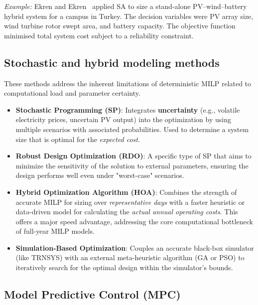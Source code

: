 \documentclass[11pt,a4paper]{report}
\begin{document}
\begin{itemize}
\textit{Example:} Ekren and Ekren~\cite{ekren2010sa} applied SA to size a stand-alone PV--wind--battery hybrid system for a campus in Turkey. The decision variables were PV array size, wind turbine rotor swept area, and battery capacity. The objective function minimised total system cost subject to a reliability constraint. 
\end{itemize}

\subsection{Stochastic and hybrid modeling methods}
These methods address the inherent limitations of deterministic MILP related to computational load and parameter certainty.

\begin{itemize}
    \item \textbf{Stochastic Programming (SP)}: Integrates \textbf{uncertainty} (e.g., volatile electricity prices, uncertain PV output) into the optimization by using multiple scenarios with associated probabilities. Used to determine a system size that is optimal for the \textit{expected cost}.
    \item \textbf{Robust Design Optimization (RDO)}: A specific type of SP that aims to minimize the sensitivity of the solution to external parameters, ensuring the design performs well even under "worst-case" scenarios.
    \item \textbf{Hybrid Optimization Algorithm (HOA)}: Combines the strength of accurate MILP for sizing over \textit{representative days} with a faster heuristic or data-driven model for calculating the \textit{actual annual operating costs}. This offers a major speed advantage, addressing the core computational bottleneck of full-year MILP models.
    \item \textbf{Simulation-Based Optimization}: Couples an accurate black-box simulator (like TRNSYS) with an external meta-heuristic algorithm (GA or PSO) to iteratively search for the optimal design within the simulator’s bounds.
\end{itemize}

\subsection{Model Predictive Control (MPC)}
\label{sub:mpc}
\end{document}
